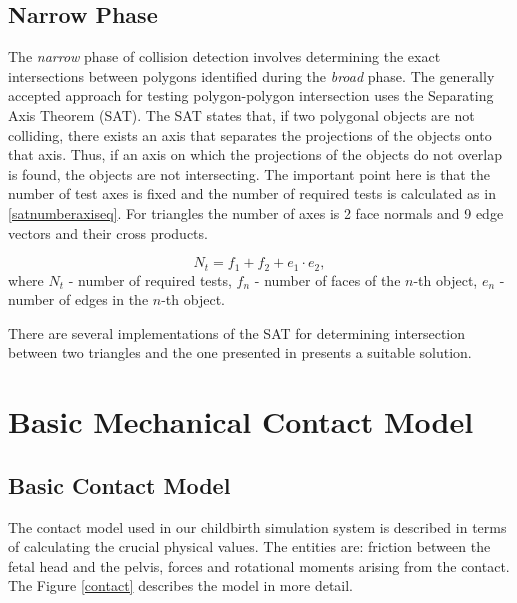   \subsection{Narrow Phase}
  The \emph{narrow} phase of collision detection involves determining the exact intersections between polygons identified during the \emph{broad} phase. The generally accepted approach for testing polygon-polygon intersection uses the Separating Axis Theorem (SAT). The SAT states that, if two polygonal objects are not colliding, there exists an axis that separates the projections of the objects onto that axis. Thus, if an axis on which the projections of the objects do not overlap is found, the objects are not intersecting. The important point here is that the number of test axes is fixed and the number of required tests is calculated as in \ref{satnumberaxiseq}. For triangles the number of axes is 2 face normals and 9 edge vectors and their cross products.

  \begin{equation}\label{satnumberaxiseq}
  N_{t} = f_{1} + f_{2} + e_{1}\cdot e_{2},
  \end{equation}
  where $N_{t}$ - number of required tests, $f_{n}$ - number of faces of the $n$-th object, $e_{n}$ - number of edges in the $n$-th object.

  There are several implementations of the SAT for determining intersection between two triangles and the one presented in \citep{SAT} presents a suitable solution.


\section{Basic Mechanical Contact Model}

  \subsection{Basic Contact Model}

  The contact model used in our childbirth simulation system is described in terms of calculating the crucial physical values. The entities are: friction between the fetal head and the pelvis, forces and rotational moments arising from the contact. The Figure \ref{contact} describes the model in more detail.

